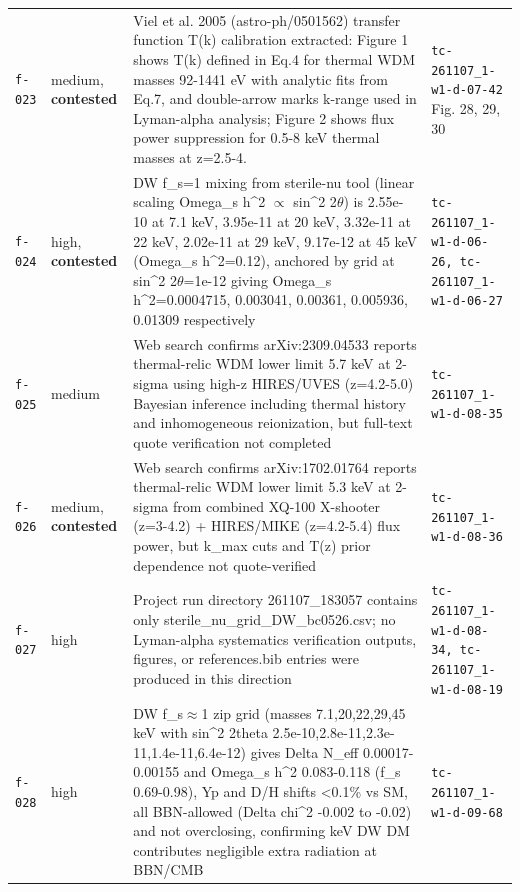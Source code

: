 \documentclass[11pt,a4paper]{article}
\begin{document}
\begin{longtable}{@{}p{}p{}p{}p{}@{}}
\texttt{f-023} & medium, \textbf{contested} & Viel et al. 2005 (astro-ph/0501562) transfer function T(k) calibration extracted: Figure 1 shows T(k) defined in Eq.4 for thermal WDM masses 92-1441 eV with analytic fits from Eq.7, and double-arrow marks k-range used in Lyman-alpha analysis; Figure 2 shows flux power suppression for 0.5-8 keV thermal masses at z=2.5-4. & \texttt{tc-261107\_\allowbreak{}1-w1-d-07-42} Fig. 28, 29, 30 \\
\texttt{f-024} & high, \textbf{contested} & DW f\_s=1 mixing from sterile-nu tool (linear scaling Omega\_s h\textasciicircum{}2 $\propto$ sin\textasciicircum{}2 2$\theta$) is 2.55e-10 at 7.1 keV, 3.95e-11 at 20 keV, 3.32e-11 at 22 keV, 2.02e-11 at 29 keV, 9.17e-12 at 45 keV (Omega\_s h\textasciicircum{}2=0.12), anchored by grid at sin\textasciicircum{}2 2$\theta$=1e-12 giving Omega\_s h\textasciicircum{}2=0.0004715, 0.003041, 0.00361, 0.005936, 0.01309 respectively & \texttt{tc-261107\_\allowbreak{}1-w1-d-06-26,\allowbreak{} tc-261107\_\allowbreak{}1-w1-d-06-27} \\
\texttt{f-025} & medium & Web search confirms arXiv:2309.04533 reports thermal-relic WDM lower limit 5.7 keV at 2-sigma using high-z HIRES/UVES (z=4.2-5.0) Bayesian inference including thermal history and inhomogeneous reionization, but full-text quote verification not completed & \texttt{tc-261107\_\allowbreak{}1-w1-d-08-35} \\
\texttt{f-026} & medium, \textbf{contested} & Web search confirms arXiv:1702.01764 reports thermal-relic WDM lower limit 5.3 keV at 2-sigma from combined XQ-100 X-shooter (z=3-4.2) + HIRES/MIKE (z=4.2-5.4) flux power, but k\_max cuts and T(z) prior dependence not quote-verified & \texttt{tc-261107\_\allowbreak{}1-w1-d-08-36} \\
\texttt{f-027} & high & Project run directory 261107\_183057 contains only sterile\_nu\_grid\_DW\_bc0526.csv; no Lyman-alpha systematics verification outputs, figures, or references.bib entries were produced in this direction & \texttt{tc-261107\_\allowbreak{}1-w1-d-08-34,\allowbreak{} tc-261107\_\allowbreak{}1-w1-d-08-19} \\
\texttt{f-028} & high & DW f\_s$\approx$1 zip grid (masses 7.1,20,22,29,45 keV with sin\textasciicircum{}2 2theta 2.5e-10,2.8e-11,2.3e-11,1.4e-11,6.4e-12) gives Delta N\_eff 0.00017-0.00155 and Omega\_s h\textasciicircum{}2 0.083-0.118 (f\_s 0.69-0.98), Yp and D/H shifts \textless{}0.1\% vs SM, all BBN-allowed (Delta chi\textasciicircum{}2 -0.002 to -0.02) and not overclosing, confirming keV DW DM contributes negligible extra radiation at BBN/CMB & \texttt{tc-261107\_\allowbreak{}1-w1-d-09-68} \\

\end{longtable}
\end{document}
